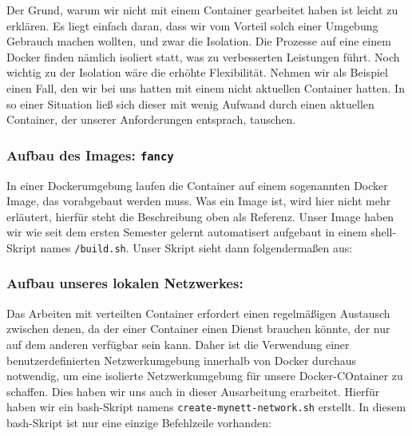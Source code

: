 Der Grund, warum wir nicht mit einem Container gearbeitet haben ist leicht zu erklären. Es liegt einfach daran, dass wir vom Vorteil solch einer Umgebung Gebrauch machen wollten, und zwar die Isolation. Die Prozesse auf eine einem Docker finden nämlich isoliert statt, was zu verbesserten Leistungen führt. Noch wichtig zu der Isolation wäre die erhöhte Flexibilität. Nehmen wir als Beispiel einen Fall, den wir bei uns hatten mit einem nicht aktuellen Container hatten. In so einer Situation ließ sich dieser mit wenig Aufwand durch einen aktuellen Container, der unserer Anforderungen entsprach, tauschen.\\

\subsubsection{Aufbau des Images: \texttt{fancy}}

In einer Dockerumgebung laufen die Container auf einem sogenannten Docker Image, das vorabgebaut werden muss. Was ein Image ist, wird hier nicht mehr erläutert, hierfür steht die Beschreibung oben als Referenz. Unser Image haben wir wie seit dem ersten Semester gelernt automatisert aufgebaut in einem shell-Skript names \texttt{/build.sh}. Unser Skript sieht dann folgendermaßen aus:

\subsubsection{Aufbau unseres lokalen Netzwerkes: }

Das Arbeiten mit verteilten Container erfordert einen regelmäßigen Austausch zwischen denen, da der einer Container einen Dienst brauchen könnte, der nur auf dem anderen verfügbar sein kann. Daher ist die Verwendung einer benutzerdefinierten Netzwerkumgebung innerhalb von Docker  durchaus notwendig, um eine isolierte Netzwerkumgebung für unsere Docker-COntainer zu schaffen. Dies haben wir uns auch in dieser Ausarbeitung erarbeitet. Hierfür haben wir ein bash-Skript namens \texttt{create-mynett-network.sh} erstellt. In diesem bash-Skript ist nur eine einzige Befehlzeile vorhanden:


